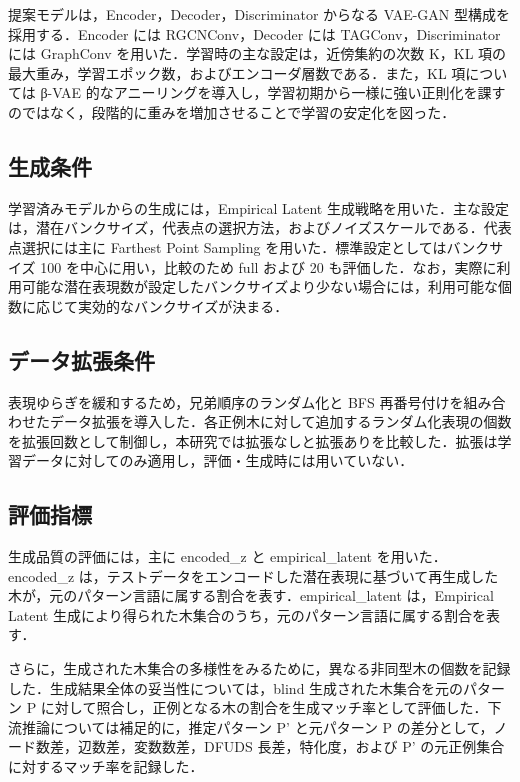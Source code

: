 \documentclass[submit,techrep,noauthor]{ipsj}
\begin{document}
提案モデルは，Encoder，Decoder，Discriminator からなる VAE-GAN 型構成を採用する．Encoder には RGCNConv，Decoder には TAGConv，Discriminator には GraphConv を用いた．学習時の主な設定は，近傍集約の次数 K，KL 項の最大重み，学習エポック数，およびエンコーダ層数である．また，KL 項については β-VAE 的なアニーリングを導入し，学習初期から一様に強い正則化を課すのではなく，段階的に重みを増加させることで学習の安定化を図った．

\subsection{生成条件}

学習済みモデルからの生成には，Empirical Latent 生成戦略を用いた．主な設定は，潜在バンクサイズ，代表点の選択方法，およびノイズスケールである．代表点選択には主に Farthest Point Sampling を用いた．標準設定としてはバンクサイズ 100 を中心に用い，比較のため full および 20 も評価した．なお，実際に利用可能な潜在表現数が設定したバンクサイズより少ない場合には，利用可能な個数に応じて実効的なバンクサイズが決まる．

\subsection{データ拡張条件}

表現ゆらぎを緩和するため，兄弟順序のランダム化と BFS 再番号付けを組み合わせたデータ拡張を導入した．各正例木に対して追加するランダム化表現の個数を拡張回数として制御し，本研究では拡張なしと拡張ありを比較した．拡張は学習データに対してのみ適用し，評価・生成時には用いていない．

\subsection{評価指標}

生成品質の評価には，主に encoded\_z と empirical\_latent を用いた．encoded\_z は，テストデータをエンコードした潜在表現に基づいて再生成した木が，元のパターン言語に属する割合を表す．empirical\_latent は，Empirical Latent 生成により得られた木集合のうち，元のパターン言語に属する割合を表す．

さらに，生成された木集合の多様性をみるために，異なる非同型木の個数を記録した．生成結果全体の妥当性については，blind 生成された木集合を元のパターン P に対して照合し，正例となる木の割合を生成マッチ率として評価した．下流推論については補足的に，推定パターン P' と元パターン P の差分として，ノード数差，辺数差，変数数差，DFUDS 長差，特化度，および P' の元正例集合に対するマッチ率を記録した．
\end{document}
